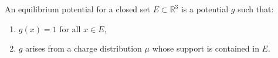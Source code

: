 An equilibrium potential for a closed set $E \subset \mathbb{R}^3$ is a potential $g$ such that:

\begin{enumerate}
  \item $g(x) = 1$ for all $x \in E$,
  \item $g$ arises from a charge distribution $\mu$ whose support is contained in $E$.
\end{enumerate}
